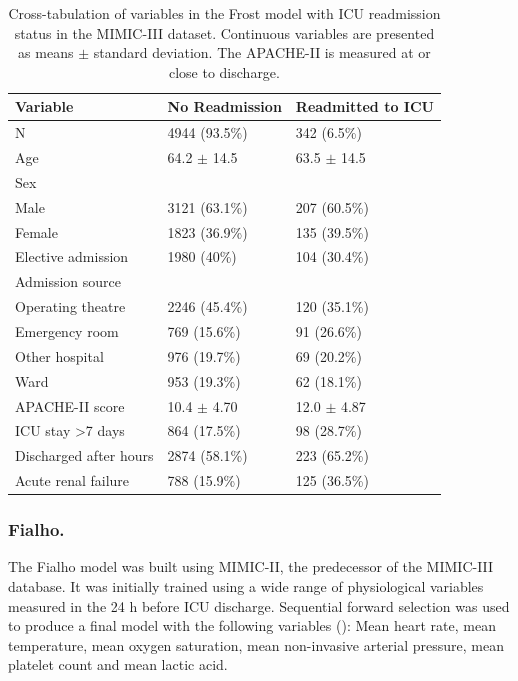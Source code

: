 \documentclass[onecolumn]{article}
\begin{document}
\begin{table}[h]
\centering
	\renewcommand{\arraystretch}{1.4}
		\caption{Cross-tabulation of variables in the Frost model with ICU readmission status in the MIMIC-III dataset. Continuous variables are presented as means $\pm$ standard deviation. The APACHE-II is measured at or close to discharge.}
	\begin{tabular}{lp{2.5cm}p{2cm}}
		\hline
		Variable & No Readmission & Readmitted to ICU\\
		\hline
		N & 4944 (93.5\%)  &      342 (6.5\%)\\
		Age & 64.2 $\pm$ 14.5 & 63.5 $\pm$ 14.5\\
		Sex &&\\
		\quad Male & 3121 (63.1\%)   &    207 (60.5\%)\\
		\quad Female & 1823 (36.9\%)  &     135 (39.5\%)\\
		Elective admission & 1980 (40\%)  &     104 (30.4\%)\\
		Admission source &&\\
		\quad Operating theatre &2246 (45.4\%)    &   120 (35.1\%)\\
		\quad Emergency room &769 (15.6\%)  &      91 (26.6\%)\\
		\quad Other hospital &976 (19.7\%)    &    69 (20.2\%)\\
		\quad Ward &953 (19.3\%)   &     62 (18.1\%)\\
		APACHE-II score & 10.4 $ \pm $ 4.70 & 12.0 $ \pm $ 4.87\\
		ICU stay >7 days & 864 (17.5\%)   &     98 (28.7\%)\\
		Discharged after hours & 2874 (58.1\%)    &   223 (65.2\%)\\
		Acute renal failure & 788 (15.9\%)   &    125 (36.5\%)\\
		\hline
	\end{tabular}
	\label{Table1Frost}
\end{table}

\subsubsection*{Fialho.}

The Fialho model was built using MIMIC-II, the predecessor of the MIMIC-III database. It was initially trained using a wide range of physiological variables measured in the 24 h before ICU discharge. Sequential forward selection was used to produce a final model with the following variables (): Mean heart rate, mean temperature, mean oxygen saturation, mean non-invasive arterial pressure, mean platelet count and mean lactic acid.
\end{document}
